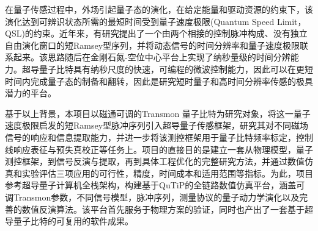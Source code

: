 \documentclass[a4paper,12pt]{article}
\begin{document}
\par 在量子传感过程中，外场引起量子态的演化，在给定能量和驱动资源的约束下，该演化达到可辨识状态所需的最短时间受到量子速度极限(Quantum Speed Limit，QSL)的约束\citet{deffner2017quantum}。近年来，有研究提出了一个由两个相接的控制脉冲构成、没有独立自由演化窗口的短Ramsey型序列，并将动态信号的时间分辨率和量子速度极限联系起来\citet{herb2024quantum}。该思路随后在金刚石氮-空位中心平台上实现了纳秒量级的时间分辨能力\citet{herb2025magnetometry}。超导量子比特具有纳秒尺度的快速，可编程的微波控制能力，因此可以在更短时间内完成量子态的制备和翻转，因此是研究短时量子和高时间分辨率传感的极具潜力的平台。

\par 基于以上背景，本项目以磁通可调的Transmon 量子比特为研究对象，将这一量子速度极限启发的短Ramsey型脉冲序列引入超导量子传感框架，研究其对不同磁场信号的响应和信息提取能力，并进一步将该测控框架用于量子比特频率标定，控制线响应表征与预失真校正等任务上。项目的直接目的是建立一套从物理模型，量子测控框架，到信号反演与提取，再到具体工程优化的完整研究方法，并通过数值仿真和实验评估三项应用的可行性，精度，时间成本和适用范围等指标。为此，项目参考超导量子计算机全栈架构，构建基于QuTiP的全链路数值仿真平台，涵盖可调Transmon参数，不同信号模型，脉冲序列，测量协议的量子动力学演化以及完善的数值反演算法。该平台首先服务于物理方案的验证，同时也产出了一套基于超导量子比特的可复用的软件成果。
\end{document}
